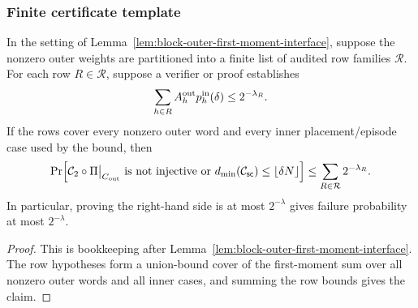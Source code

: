 \subsubsection{Finite certificate template}
\label{subsec:local-code-certificate-template}

\begin{lemma}
\label{lem:finite-block-certificate-template}
In the setting of Lemma~\ref{lem:block-outer-first-moment-interface}, suppose
the nonzero outer weights are partitioned into a finite list of audited row
families \(\mathcal R\).  For each row \(R\in\mathcal R\), suppose a verifier or
proof establishes
\[
\sum_{h\in R} A_h^{\mathrm{out}}p_h^{\rm in}(\delta)\le 2^{-\lambda_R}.
\]
If the rows cover every nonzero outer word and every inner placement/episode
case used by the bound, then
\[
\Pr\Bigl[
 {\mathcal{C}_2}\circ\Pi\big|_{C_{\mathrm{out}}}\text{ is not injective}
 \ \text{or}\ d_{\min}({\mathcal{C}_{\mathsf{sc}}})\le\lfloor\delta N\rfloor
\Bigr]
\le
\sum_{R\in\mathcal R}2^{-\lambda_R}.
\]
In particular, proving the right-hand side is at most \(2^{-\lambda}\) gives
failure probability at most \(2^{-\lambda}\).
\end{lemma}

\begin{proof}
This is bookkeeping after Lemma~\ref{lem:block-outer-first-moment-interface}.
The row hypotheses form a union-bound cover of the first-moment sum over all
nonzero outer words and all inner cases, and summing the row bounds gives the
claim.
\end{proof}
